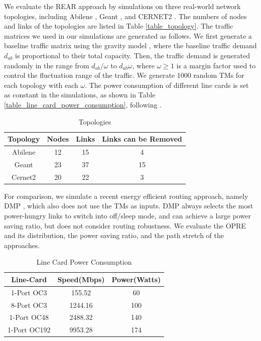 \documentclass[conference]{IEEEtran}
\begin{document}
We evaluate the REAR approach by simulations on three real-world network topologies, including Abilene \cite{networking:abilene}, Geant \cite{networking:geant}, and CERNET2 \cite{networking:cernet2}. The numbers of nodes and links of the topologies are listed in Table \ref{table_topology}. The traffic matrices we used in our simulations are generated as follows. We first generate a baseline traffic matrix using the gravity model \cite{networking:gravity}, where the baseline traffic demand $d_{ab}$ is proportional to their total capacity. Then, the traffic demand is generated randomly in the range from $d_{ab}/\omega$ to $d_{ab}\omega$, where $\omega \geq 1$ is a margin factor used to control the fluctuation range of the traffic. We generate 1000 random TMs for each topology with each $\omega$. The power consumption of different line cards is set as constant in the simulations, as shown in Table \ref{table_line_card_power_consumption}, following \cite{networking:greente}.

\begin{table}[h]
\label{table_topology}
\renewcommand{\arraystretch}{1}
\caption{Topologies}
\label{three topologies}
\centering
\begin{tabular}{|c|c|c|c|}
\hline
\bfseries Topology & \bfseries Nodes & \bfseries Links & \bfseries Links can be Removed \\
\hline
Abilene & 12 & 15 & 4 \\
\hline
Geant & 23 & 37 & 15 \\
\hline
Cernet2 & 20 & 22 & 3 \\
\hline
\end{tabular}
\end{table}

For comparison, we simulate a recent energy efficient routing approach, namely DMP \cite{networking:dmp}, which also does not use the TMs as inputs. DMP always selects the most power-hungry links to switch into off/sleep mode, and can achieve a large power saving ratio, but does not consider routing robustness. We evaluate the OPRE and its distribution, the power saving ratio, and the path stretch of the approaches.

\begin{table}[h]
\label{table_line_card_power_consumption}
\renewcommand{\arraystretch}{1}
\caption{Line Card Power Consumption}
\label{power model}
\centering
\begin{tabular}{|c|c|c|}
\hline
\bfseries Line-Card & \bfseries Speed(Mbps) & \bfseries Power(Watts) \\
\hline
1-Port OC3 & 155.52 & 60 \\
\hline
8-Port OC3 & 1244.16 & 100 \\
\hline
1-Port OC48 & 2488.32 & 140 \\
\hline
1-Port OC192 & 9953.28 & 174 \\
\hline
\end{tabular}
\end{table}
\end{document}
